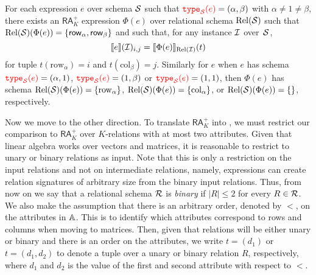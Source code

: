 \begin{proposition}\label{prop:sum_to_ara} 
	For each \langsum expression $e$ over schema $\mathcal{S}$ such that ${\color{red} \texttt{type}_{\mathcal{S}}(e)}=(\alpha,\beta)$ with $\alpha\neq 1\neq\beta$, there exists an $\mathsf{RA}_{K}^+$  expression $\Phi(e)$ over relational schema $\text{Rel}(\mathcal{S})$ such that $\text{Rel}(\mathcal{S})(\Phi(e))=\{\mathsf{row}_\alpha,\mathsf{row}_\beta\}$ and 
	such that, for any instance $\mathcal{I}$ over~$\mathcal{S}$,
	$$
	\llbracket e \rrbracket(\mathcal{I})_{i,j}=\llbracket \Phi(e) \rrbracket_{\text{Rel}(\mathcal{I})}(t)
	$$
	for tuple $t(\mathrm{row}_\alpha)=i$ and $t(\mathrm{col}_\beta)=j$. Similarly for $e$ when $e$ has schema ${\color{red} \texttt{type}_{\mathcal{S}}(e)}=(\alpha,1)$, ${\color{red} \texttt{type}_{\mathcal{S}}(e)}=(1,\beta)$ or ${\color{red} \texttt{type}_{\mathcal{S}}(e)}=(1,1)$, then $\Phi(e)$ has schema $\text{Rel}(\mathcal{S})(\Phi(e))=\{\mathrm{row}_\alpha\}$,
	$\text{Rel}(\mathcal{S})(\Phi(e))=\{\mathrm{col}_\alpha\}$, or
	$\text{Rel}(\mathcal{S})(\Phi(e))=\{\}$, respectively.
\end{proposition}



Now we move to the other direction.
To translate $\mathsf{RA}_{K}^+$  into \langsum, we must restrict our comparison to $\mathsf{RA}_{K}^+$  over $K$-relations with at most two attributes. Given that linear algebra works over vectors and matrices, it is reasonable to restrict to unary or binary relations as input. Note that this is only a restriction on the input relations and not on intermediate relations, namely, expressions can create relation signatures of arbitrary size from the binary input relations. 
Thus, from now on we say that a relational schema $\mathcal{R}$ is \textit{binary} if $|R| \leq 2$ for every $R \in \mathcal{R}$. We also make the assumption that there is an arbitrary order, denoted by $<$, on the attributes in $\mathbb{A}$. 
This is to identify which attributes correspond to rows and columns when moving to matrices. 
Then, given that relations will be  either unary or binary and there is an order on the attributes, we write $t = (d_1)$ or $t = (d_1,d_2)$ to denote a tuple over a unary or binary relation $R$, respectively, where $d_1$ and $d_2$ is the value of the first and second attribute with respect to $<$.

